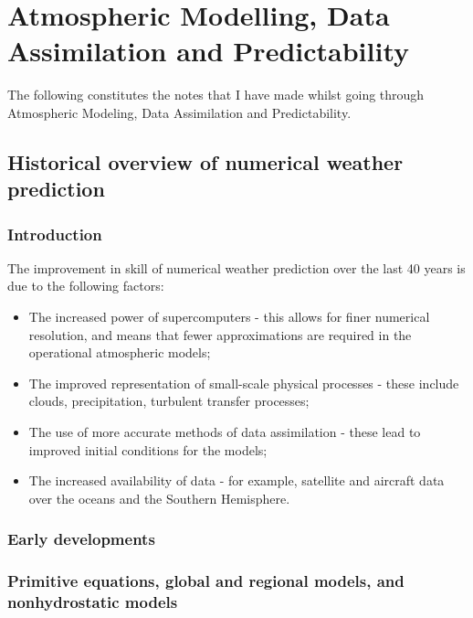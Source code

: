 \chapter{Atmospheric Modelling, Data Assimilation and Predictability}
\label{ch:kalnay}

The following constitutes the notes that I have made whilst going through Atmospheric Modeling, Data Assimilation and Predictability\citep{kalnay_atmospheric_2003}.

\section{Historical overview of numerical weather prediction}
\label{sec:kalnay:historical_overview}

\subsection{Introduction}
\label{subs:historical_overview:introduction}

The improvement in skill of numerical weather prediction over the last 40 years is due to the following factors:
\begin{itemize}
\item The increased power of supercomputers - this allows for finer numerical resolution, and means that fewer approximations are required in the operational atmospheric models;
\item The improved representation of small-scale physical processes - these include clouds, precipitation, turbulent transfer processes;
\item The use of more accurate methods of data assimilation - these lead to improved initial conditions for the models;
\item The increased availability of data - for example, satellite and aircraft data over the oceans and the Southern Hemisphere. 
\end{itemize}

\subsection{Early developments}
\label{subs:historical_overview:early_developments}

\subsection{Primitive equations, global and regional models, and nonhydrostatic models}
\label{subs:historical_overview:primitive_equations}


